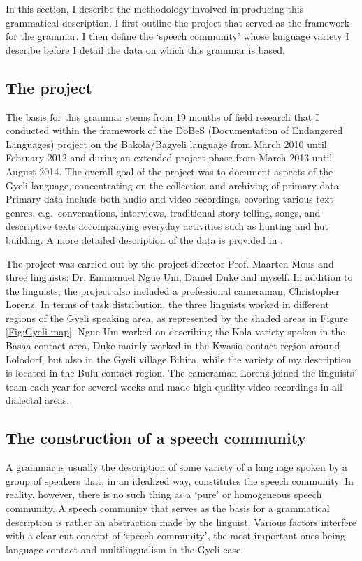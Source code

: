 In this section, I describe the methodology involved in producing this grammatical description. I first outline the project that served as the framework for the grammar. I then define the `speech community' whose language variety I describe before I detail the data on which this grammar is based. 

\subsection{The project}
\label{sec:Dobes}

The basis for this grammar stems from 19 months of field research that I conducted within the framework of the DoBeS (Documentation of Endangered Languages) project on the Bakola/Bagyeli language from March 2010 until February 2012 and during an extended project phase from March 2013 until August 2014. 
The overall goal of the project was to document aspects of the Gyeli language, concentrating on the collection and archiving of primary data. Primary data include both audio and video recordings, covering various text genres, e.g.\ conversations, interviews, traditional story telling, songs, and descriptive texts accompanying everyday activities such as hunting and hut building. A more detailed description of the data is provided in . 

The project was carried out by the project director Prof. Maarten Mous and three linguists: Dr. Emmanuel Ngue Um, Daniel Duke and myself. In addition to the linguists, the project also included a professional cameraman, Christopher Lorenz. In terms of task distribution, the three linguists 
worked in different regions of the Gyeli speaking area, as represented by the shaded areas in Figure \ref{Fig:Gyeli-map}. Ngue Um worked on describing the Kola variety spoken in the Basaa contact area, Duke mainly worked in the Kwasio contact region around Lolodorf, but also in the Gyeli village Bibira, while the variety of my description is located in the Bulu contact region. The cameraman Lorenz joined the linguists' team each year for several weeks and made high-quality video recordings in all dialectal areas.  


\subsection{The construction of a speech community}

A grammar is usually the description of some variety of a language spoken by a group of speakers that, in an idealized way, constitutes the speech community. In reality, however,   
there is no such thing as a `pure' or homogeneous speech community. A speech community that serves as the basis for a grammatical description is rather an abstraction made by the linguist. Various factors interfere with a clear-cut concept of `speech community', the most important ones being language contact and multilingualism in the Gyeli case.

